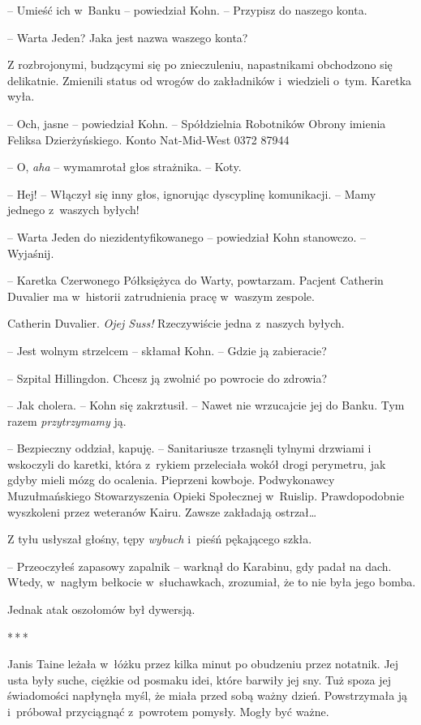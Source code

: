 \documentclass[oneside,polish,11pt,sfheadings]{mwbk}
\newcommand{\threeast}{\bigskip\par\centerline{*\,*\,*}\medskip\par}%
\let\footnote=\endnote
\begin{document}
-- Umieść ich w~Banku -- powiedział Kohn. -- Przypisz do naszego konta.

-- Warta Jeden? Jaka jest nazwa waszego konta?

Z rozbrojonymi, budzącymi się po znieczuleniu, napastnikami obchodzono
się delikatnie. Zmienili status od wrogów do zakładników i~wiedzieli o~tym. Karetka wyła.

-- Och, jasne -- powiedział Kohn. -- Spółdzielnia Robotników Obrony imienia
Feliksa Dzierżyńskiego. Konto Nat-Mid-West 0372 87944

-- O, \emph{aha} -- wymamrotał głos strażnika. -- Koty.

-- Hej! -- Włączył się inny głos, ignorując dyscyplinę komunikacji. -- Mamy
jednego z~waszych byłych!

-- Warta Jeden do niezidentyfikowanego -- powiedział Kohn stanowczo. --
Wyjaśnij.

-- Karetka Czerwonego Półksiężyca do Warty, powtarzam. Pacjent Catherin
Duvalier ma w~historii zatrudnienia pracę w~waszym zespole.

Catherin Duvalier. \emph{Ojej Suss!} Rzeczywiście jedna z~naszych
byłych.

-- Jest wolnym strzelcem -- skłamał Kohn. -- Gdzie ją zabieracie?

-- Szpital Hillingdon. Chcesz ją zwolnić po powrocie do zdrowia?

-- Jak cholera. -- Kohn się zakrztusił. -- Nawet nie wrzucajcie jej do
Banku. Tym razem \emph{przytrzymamy} ją.

-- Bezpieczny oddział, kapuję. -- Sanitariusze trzasnęli tylnymi drzwiami
i wskoczyli do karetki, która z~rykiem przeleciała wokół drogi
perymetru, jak gdyby mieli mózg do ocalenia. Pieprzeni kowboje.
Podwykonawcy Muzułmańskiego Stowarzyszenia Opieki Społecznej w~Ruislip.\footnote{część Londynu -- przyp. tłum.} Prawdopodobnie wyszkoleni
przez weteranów Kairu. Zawsze zakładają ostrzał\ldots

Z tyłu usłyszał głośny, tępy \emph{wybuch} i~pieśń pękającego szkła. 

-- Przeoczyłeś zapasowy zapalnik -- warknął do Karabinu, gdy padał na dach.
Wtedy, w~nagłym bełkocie w~słuchawkach, zrozumiał, że to nie była jego
bomba.

Jednak atak oszołomów był dywersją.

\threeast

Janis Taine leżała w~łóżku przez kilka minut po obudzeniu przez
notatnik. Jej usta były suche, ciężkie od posmaku idei, które barwiły
jej sny. Tuż spoza jej świadomości napłynęła myśl, że miała przed sobą
ważny dzień. Powstrzymała ją i~próbował przyciągnąć z~powrotem pomysły.
Mogły być ważne.
\end{document}
